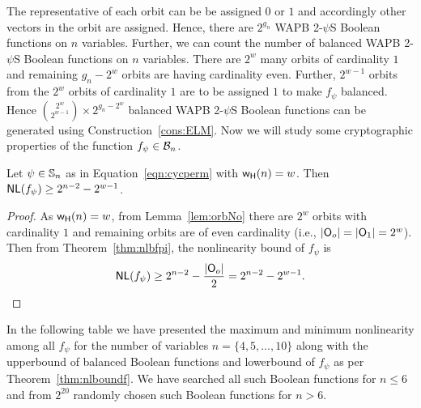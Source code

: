 \documentclass{llncs}
\begin{document}
The representative of each orbit can be be assigned $0$ or $1$ and accordingly other vectors in the orbit are assigned. Hence, there are $2^{g_n}$ WAPB 2-$\psi$S Boolean functions on $n$ variables. Further, we can count the number of balanced WAPB 2-$\psi$S Boolean functions on $n$ variables. There are $2^w$ many orbits of cardinality $1$ and remaining $g_n - 2^w$ orbits are having cardinality even. 
Further, $2^{w-1}$ orbits from the $2^w$ orbits of cardinality $1$ are to be assigned $1$ to make $f_\psi$ balanced. Hence $\binom{2^w}{2^{w-1}}\times 2^{g_n - 2^w}$ balanced WAPB 2-$\psi$S Boolean functions can be generated using Construction~\ref{cons:ELM}.
Now we will study some cryptographic properties of the function $f_\psi \in \mathcal{B}_n$. 

\begin{theorem}\label{thm:nlboundf}
Let $\psi \in \mathbb{S}_n$ as in Equation~\ref{eqn:cycperm} with $\mathsf{w_H}(n) = w$.
Then $\mathsf{NL}(f_\psi) \ge 2^{n-2} - 2^{w-1}$.
\end{theorem}
\begin{proof}
As $\mathsf{w_H}(n) = w$, from Lemma~\ref{lem:orbNo} there are $2^w$ orbits with cardinality $1$ and remaining orbits are of even cardinality (i.e., $|\mathsf{O}_o| = |\mathsf{O}_1| = 2^w$).
Then from Theorem~\ref{thm:nlbfpi}, the nonlinearity bound of $f_\psi$ is
$$\mathsf{NL}(f_\psi) \ge 2^{n-2} - \frac{|\mathsf{O}_o|}{2} = 2^{n-2} - 2^{w-1}.$$
\end{proof}
In the following table we have presented the maximum and minimum nonlinearity among all $f_\psi$ for the number of variables $n = \{4, 5, \ldots, 10\}$ along with the upperbound of balanced Boolean functions and lowerbound of $f_{\psi}$ as per Theorem~\ref{thm:nlboundf}. We have searched all such Boolean functions for $n \leq 6$ and from $2^{20}$ randomly chosen such Boolean functions for $n > 6$.
\end{document}
